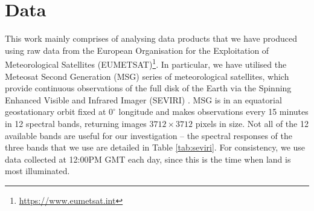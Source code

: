 \section{Data}
\begin{table}
  \centering
  \caption{Spectral characteristics of the three SEVIRI channels used
    in our work. Shown are the central, minimum and maximum
    wavelengths for the three spectral bands that we use.}
  \label{tab:seviri}
\end{table}

This work mainly comprises of analysing data products that we have produced
using raw data from the European Organisation for the Exploitation of
Meteorological Satellites
(EUMETSAT)\footnote{\url{https://www.eumetsat.int}}. In particular, we have
utilised the Meteosat Second Generation (MSG) series of meteorological
satellites, which provide continuous observations of the full disk of the Earth
via the Spinning Enhanced Visible and Infrared Imager (SEVIRI)
\citep{schmetz2002}. MSG is in an equatorial geostationary orbit fixed at
$0^{\circ}$ longitude and makes observations every 15 minutes in 12 spectral bands,
returning images $3712 \times 3712$ pixels in size. Not all of the 12 available bands
are useful for our investigation -- the spectral responses of the three bands
that we use are detailed in Table \ref{tab:seviri}. For consistency, we use data
collected at 12:00PM GMT each day, since this is the time when land is most
illuminated.

